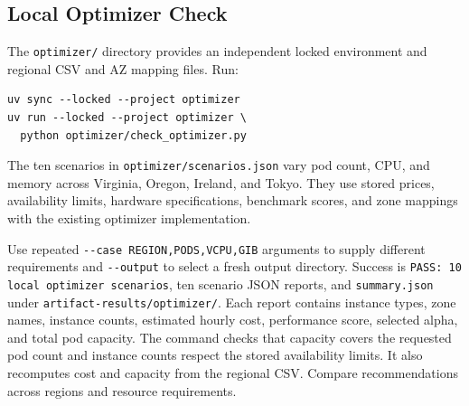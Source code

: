 \documentclass[sigconf,9pt,nonacm,balance=false]{acmart}
\newcommand{\pathcode}[1]{\nolinkurl{#1}}
\begin{document}
\subsection{Local Optimizer Check}
The \pathcode{optimizer/} directory provides an independent locked environment
and regional CSV and AZ mapping files. Run:
\begin{lstlisting}
uv sync --locked --project optimizer
uv run --locked --project optimizer \
  python optimizer/check_optimizer.py
\end{lstlisting}
The ten scenarios in \pathcode{optimizer/scenarios.json} vary pod count,
CPU, and memory across Virginia, Oregon, Ireland, and Tokyo. They use
stored prices, availability limits, hardware specifications, benchmark
scores, and zone mappings with the existing optimizer implementation.

Use repeated \texttt{-{}-case REGION,PODS,VCPU,GIB} arguments to supply different
requirements and \texttt{-{}-output} to select a fresh output directory.
Success is \texttt{PASS: 10 local optimizer scenarios}, ten scenario JSON
reports, and \pathcode{summary.json} under \pathcode{artifact-results/optimizer/}.
Each report contains instance
types, zone names, instance counts, estimated hourly cost, performance score,
selected alpha, and total pod capacity. The command checks that capacity
covers the requested pod count and instance counts respect the stored
availability limits. It also recomputes cost and capacity from the regional
CSV. Compare recommendations across regions and resource requirements.
\end{document}
